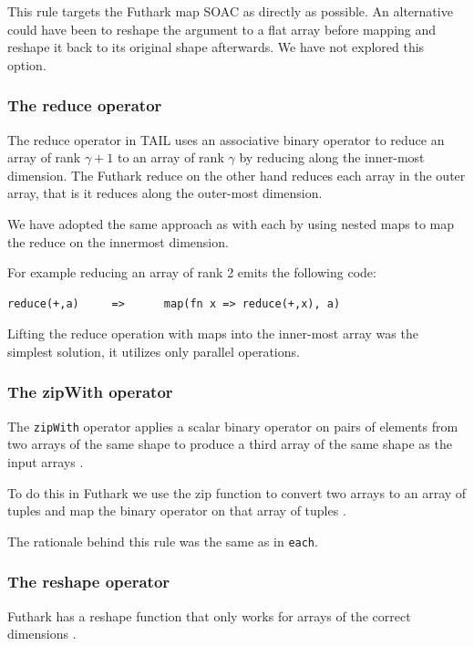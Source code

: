 \documentclass[11pt]{article}
\begin{document}
This rule targets the Futhark map SOAC as directly as possible. An alternative could have been to reshape the
argument to a flat array before mapping and reshape it back to its original shape afterwards. We have not explored this option.

\subsubsection{The reduce operator}

The reduce operator in TAIL uses an associative binary operator to reduce an array of rank
$\gamma+1$ to an array of rank $\gamma$ by reducing along the inner-most dimension\cite{ElsmanDybdal:Array:2014}.
The Futhark reduce on the other hand reduces each array in the outer array, that is it reduces along the outer-most dimension\cite{TroelsHenriksen}.
 
We have adopted the same approach as with each by using nested maps to map the reduce on the innermost dimension.
 
For example reducing an array of rank 2 emits the following code:
 
\begin{lstlisting}[numbers=none,frame=none]
reduce(+,a)     =>      map(fn x => reduce(+,x), a)
\end{lstlisting}

Lifting the reduce operation with maps into the inner-most array was the simplest solution, it utilizes only parallel operations.

\subsubsection{The zipWith operator}
The {\tt zipWith} operator applies a scalar binary operator on pairs of elements from two arrays of the same shape to
produce a third array of the same shape as the input arrays \cite{ElsmanDybdal:Array:2014}.
 
To do this in Futhark we use the zip function to convert two arrays to an array of tuples and map the binary operator on that array of tuples \cite{TroelsHenriksen}.

The rationale behind this rule was the same as in {\tt each}.

\subsubsection{The reshape operator} 
Futhark has a reshape function that only works for arrays of the correct dimensions \cite{TroelsHenriksen}.
\end{document}
